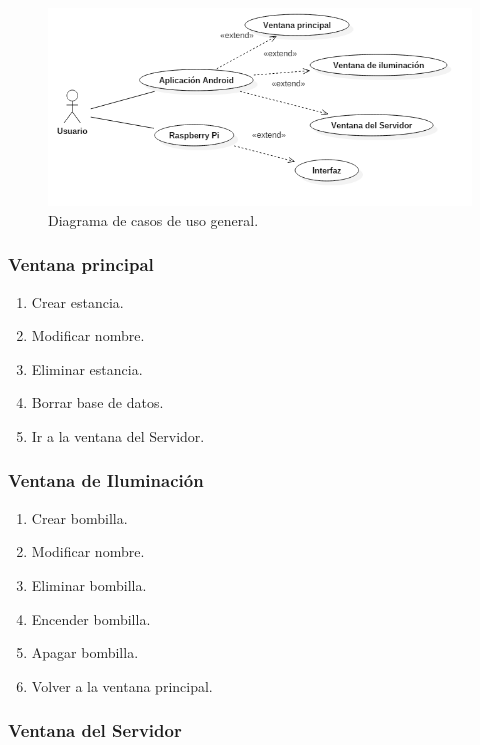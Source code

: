 \begin{figure}[h!]
	\centering
	\includegraphics[width=1.2\linewidth]{img/CDUGeneral}
	\caption{Diagrama de casos de uso general.}
	\label{fig:CDUGeneral}
\end{figure}

\subsubsection{Ventana principal}

\begin{enumerate}
	\item Crear estancia.
	\item Modificar nombre.
	\item Eliminar estancia.
	\item Borrar base de datos.
	\item Ir a la ventana del Servidor. 
\end{enumerate}

\subsubsection{Ventana de Iluminación}

\begin{enumerate}
	\item Crear bombilla.
	\item Modificar nombre.
	\item Eliminar bombilla.
	\item Encender bombilla.
	\item Apagar bombilla.
	\item Volver a la ventana principal. 
\end{enumerate}

\subsubsection{Ventana del Servidor}

